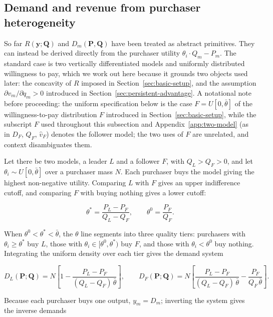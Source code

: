 \documentclass[11pt]{article}
\begin{document}
\subsection{Demand and revenue from purchaser heterogeneity}
\label{subsec:two-model-demand}

So far $R(\mathbf y;\mathbf Q)$ and $D_m(\mathbf P,\mathbf Q)$ have been treated as abstract primitives. They can instead be derived directly from the purchaser utility $\theta_i\cdot Q_m-P_m$. The standard case is two vertically differentiated models and uniformly distributed willingness to pay, which we work out here because it grounds two objects used later: the concavity of $R$ imposed in Section~\ref{sec:basic-setup}, and the assumption $\partial v_m/\partial q_m>0$ introduced in Section~\ref{sec:persistent-advantage}. A notational note before proceeding: the uniform specification below is the case $F=U[0,\bar\theta]$ of the willingness-to-pay distribution $F$ introduced in Section~\ref{sec:basic-setup}, while the subscript $F$ used throughout this subsection and Appendix~\ref{app:two-model} (as in $D_F$, $Q_F$, $\widehat v_F$) denotes the follower model; the two uses of $F$ are unrelated, and context disambiguates them.

Let there be two models, a leader $L$ and a follower $F$, with $Q_L>Q_F>0$, and let $\theta_i\sim U[0,\bar\theta]$ over a purchaser mass $N$. Each purchaser buys the model giving the highest non-negative utility. Comparing $L$ with $F$ gives an upper indifference cutoff, and comparing $F$ with buying nothing gives a lower cutoff:

\begin{equation}\theta^{*}=\frac{P_L-P_F}{Q_L-Q_F},\qquad \theta^{0}=\frac{P_F}{Q_F}.\end{equation}

When $\theta^{0}<\theta^{*}<\bar\theta$, the $\theta$ line segments into three quality tiers: purchasers with $\theta_i\geq\theta^{*}$ buy $L$, those with $\theta_i\in[\theta^{0},\theta^{*})$ buy $F$, and those with $\theta_i<\theta^{0}$ buy nothing. Integrating the uniform density over each tier gives the demand system

\begin{equation}D_L(\mathbf P;\mathbf Q)=N\left[1-\frac{P_L-P_F}{(Q_L-Q_F)\,\bar\theta}\right],\qquad D_F(\mathbf P;\mathbf Q)=N\left[\frac{P_L-P_F}{(Q_L-Q_F)\,\bar\theta}-\frac{P_F}{Q_F\,\bar\theta}\right].\end{equation}

Because each purchaser buys one output, $y_m=D_m$; inverting the system gives the inverse demands
\end{document}
